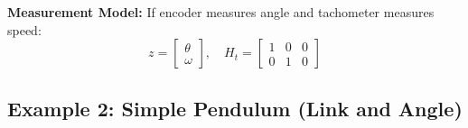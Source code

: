 \begin{tcolorbox}[colback=blue!5!white,colframe=blue!75!black,title=DC Motor Dynamics]
\textbf{Measurement Model:} If encoder measures angle and tachometer measures speed:
\begin{equation}
z = \begin{bmatrix} \theta \\ \omega \end{bmatrix}, \quad H_t = \begin{bmatrix} 1 & 0 & 0 \\ 0 & 1 & 0 \end{bmatrix}
\end{equation}

\end{tcolorbox}

\subsection{Example 2: Simple Pendulum (Link and Angle)}

